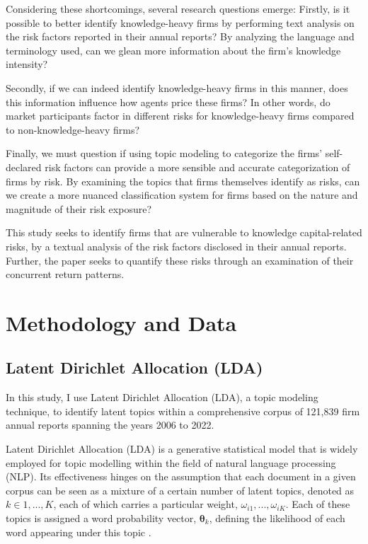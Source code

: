 \documentclass[12pt, letterpaper]{article}
\begin{document}
Considering these shortcomings, several research questions emerge: Firstly, is it possible to better identify knowledge-heavy firms by performing text analysis on the risk factors reported in their annual reports? By analyzing the language and terminology used, can we glean more information about the firm's knowledge intensity?

Secondly, if we can indeed identify knowledge-heavy firms in this manner, does this information influence how agents price these firms? In other words, do market participants factor in different risks for knowledge-heavy firms compared to non-knowledge-heavy firms?

Finally, we must question if using topic modeling to categorize the firms' self-declared risk factors can provide a more sensible and accurate categorization of firms by risk. By examining the topics that firms themselves identify as risks, can we create a more nuanced classification system for firms based on the nature and magnitude of their risk exposure?

This study seeks to identify firms that are vulnerable to knowledge capital-related risks, by a textual analysis of the risk factors disclosed in their annual reports. Further, the paper seeks to quantify these risks through an examination of their concurrent return patterns.

\section{Methodology and Data}


\subsection{Latent Dirichlet Allocation (LDA)}

In this study, I use Latent Dirichlet Allocation (LDA), a topic modeling technique, to identify latent topics within a comprehensive corpus of 121,839 firm annual reports spanning the years 2006 to 2022. 



Latent Dirichlet Allocation (LDA) is a generative statistical model that is widely employed for topic modelling within the field of natural language processing (NLP). Its effectiveness hinges on the assumption that each document in a given corpus can be seen as a mixture of a certain number of latent topics, denoted as $k \in {1, ..., K}$, each of which carries a particular weight, $\omega_{i1}, ..., \omega_{iK}$. Each of these topics is assigned a word probability vector, $\mathbf{\theta}_k$, defining the likelihood of each word appearing under this topic \citep{Blei2003-ay}.
\end{document}
